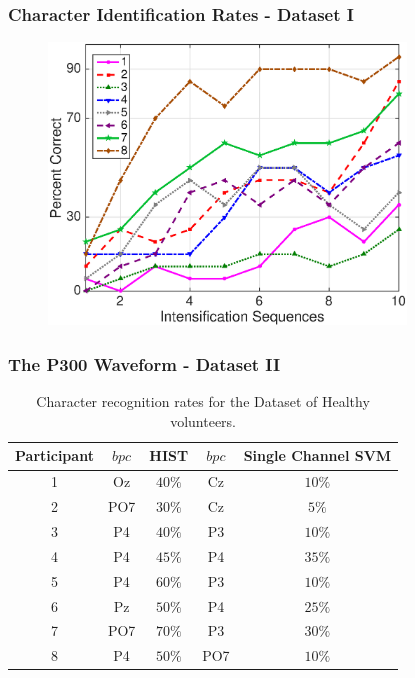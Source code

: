 \documentclass[aspectratio=169]{beamer}
\begin{document}
\begin{frame}
\frametitle{Character Identification Rates - Dataset I}
\begin{center}
\begin{figure}[h!]
\centering
\includegraphics[width=9.5cm]{images/performance.eps}
\label{fig:performance}
\end{figure}
\end{center}
\end{frame} 


\begin{frame}
\frametitle{The P300 Waveform - Dataset II}
\begin{center}
\begin{table}[h!]
\caption{Character recognition rates for the Dataset of Healthy volunteers.}
\centering
\begin{tabular}{c|cc|cc}
\toprule
\textbf{Participant}	&  $bpc$	&  HIST &  $bpc$	&  Single Channel SVM \\
\midrule
1     &     Oz   &   $40\%$  &  Cz   &  $10\%$    \\
2     &     PO7   &   $30\%$      &  Cz   & $5\%$   \\
3     &     P4   &   $40\%$    &  P3   & $10\%$    \\
4     &     P4 &   $45\%$    &  P4   & $35\%$     \\
5     &     P4 &   $60\%$  &  P3   & $10\%$     \\
6     &     Pz &   $50\%$ &  P4   & $25\%$     \\
7     &     PO7 &   $70\%$  &  P3   & $30\%$     \\
8     &     P4 &   $50\%$    &  PO7   & $10\%$    \\

\end{tabular}
\label{tab:resultsown}
\end{table}
\end{center}
\end{frame} 
\end{document}
